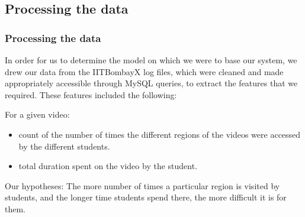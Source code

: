 \documentclass[12pt,xcolor=dvipsnames]{beamer}
\begin{document}
\subsection{Processing the data}
\begin{frame}[t]
\frametitle{Processing the data}

In order for us to determine the model on which we were to base our system, we drew our data from the  IITBombayX log files, which were cleaned and made appropriately accessible through MySQL queries, to extract the features that we required. These features included the following:

For a given video:
\begin{itemize}

\item count of the number of times the different regions of the videos were accessed by the different students.
\item total duration spent on the video by the student.

\end{itemize}

\begin{large}
 Our hypotheses: The more number of times a particular region is visited by students, and the longer time students spend there, the more difficult it is for them.
\end{large}

\end{frame}
\end{document}
